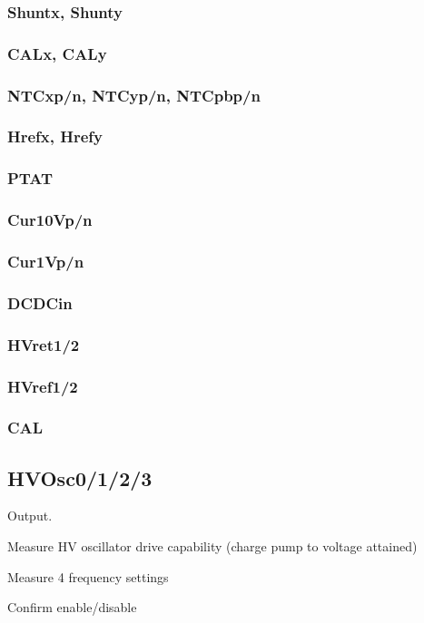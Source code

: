 \documentclass[11pt]{article}   			%
\begin{document}
\subsubsection{Shuntx, Shunty}

\subsubsection{CALx, CALy}

\subsubsection{NTCxp/n, NTCyp/n, NTCpbp/n}

\subsubsection{Hrefx, Hrefy}

\subsubsection{PTAT}

\subsubsection{Cur10Vp/n}

\subsubsection{Cur1Vp/n}

\subsubsection{DCDCin}

\subsubsection{HVret1/2}

\subsubsection{HVref1/2}

\subsubsection{CAL}

\subsection{HVOsc0/1/2/3}
Output. 
\begin{compactitem}
    \item{Measure HV oscillator drive capability (charge pump to voltage attained)}
	\item{Measure 4 frequency settings}
	\item{ Confirm enable/disable}
\end{compactitem}
\end{document}
